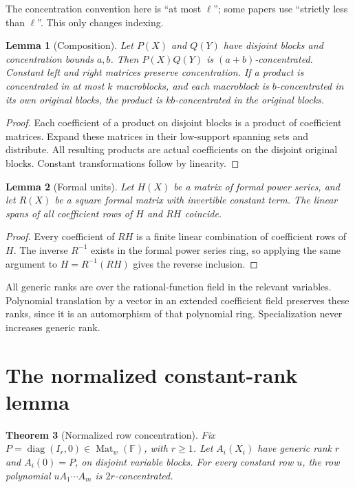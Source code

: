 \documentclass[11pt]{article}
\newtheorem{theorem}{Theorem}[section]
\newtheorem{lemma}[theorem]{Lemma}
\theoremstyle{definition}\newtheorem{definition}[theorem]{Definition}
\theoremstyle{remark}\newtheorem{remark}[theorem]{Remark}
\newcommand{\F}{\mathbb F}
\newcommand{\Mat}{\operatorname{Mat}}
\begin{document}
The concentration convention here is ``at most $\ell$''; some papers use
``strictly less than $\ell$''. This only changes indexing.

\begin{lemma}[Composition]\label{lem:composition}
Let $P(X)$ and $Q(Y)$ have disjoint blocks and concentration bounds $a,b$.
Then $P(X)Q(Y)$ is $(a+b)$-concentrated. Constant left and right matrices
preserve concentration. If a product is concentrated in at most $k$
macroblocks, and each macroblock is $b$-concentrated in its own original
blocks, the product is $kb$-concentrated in the original blocks.
\end{lemma}
\begin{proof}
Each coefficient of a product on disjoint blocks is a product of
coefficient matrices. Expand these matrices in their low-support spanning
sets and distribute. All resulting products are actual coefficients on
the disjoint original blocks. Constant transformations follow by linearity.
\end{proof}

\begin{lemma}[Formal units]\label{lem:units}
Let $H(X)$ be a matrix of formal power series, and let $R(X)$ be a square
formal matrix with invertible constant term. The linear spans of all
coefficient rows of $H$ and $RH$ coincide.
\end{lemma}
\begin{proof}
Every coefficient of $RH$ is a finite linear combination of coefficient
rows of $H$. The inverse $R^{-1}$ exists in the formal power series ring,
so applying the same argument to $H=R^{-1}(RH)$ gives the reverse inclusion.
\end{proof}

All generic ranks are over the rational-function field in the relevant
variables. Polynomial translation by a vector in an extended coefficient
field preserves these ranks, since it is an automorphism of that
polynomial ring. Specialization never increases generic rank.

\section{The normalized constant-rank lemma}

\begin{theorem}[Normalized row concentration]\label{thm:normalized}
Fix $P=\operatorname{diag}(I_r,0)\in\Mat_w(\F)$, with $r\ge1$. Let
$A_i(X_i)$ have generic rank $r$ and $A_i(0)=P$, on disjoint variable
blocks. For every constant row $u$, the row polynomial
$uA_1\cdots A_m$ is $2r$-concentrated.
\end{theorem}
\end{document}
